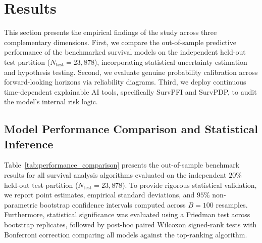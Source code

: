 \documentclass[pdflatex,iicol,sn-mathphys-ay]{sn-jnl}
\theoremstyle{thmstyleone}%
\theoremstyle{thmstyletwo}%
\theoremstyle{thmstylethree}%
\begin{document}
\section{Results}
\label{sec:results}

This section presents the empirical findings of the study across three complementary dimensions. First, we compare the out-of-sample predictive performance of the benchmarked survival models on the independent held-out test partition ($N_{\text{test}} = 23{,}878$), incorporating statistical uncertainty estimation and hypothesis testing. Second, we evaluate genuine probability calibration across forward-looking horizons via reliability diagrams. Third, we deploy continuous time-dependent explainable AI tools, specifically SurvPFI and SurvPDP, to audit the model's internal risk logic.

\subsection{Model Performance Comparison and Statistical Inference}
\label{sec:performance_comparison}

Table~\ref{tab:performance_comparison} presents the out-of-sample benchmark results for all survival analysis algorithms evaluated on the independent $20\%$ held-out test partition ($N_{\text{test}} = 23{,}878$). To provide rigorous statistical validation, we report point estimates, empirical standard deviations, and $95\%$ non-parametric bootstrap confidence intervals computed across $B = 100$ resamples. Furthermore, statistical significance was evaluated using a Friedman test across bootstrap replicates, followed by post-hoc paired Wilcoxon signed-rank tests with Bonferroni correction comparing all models against the top-ranking algorithm.
\end{document}
